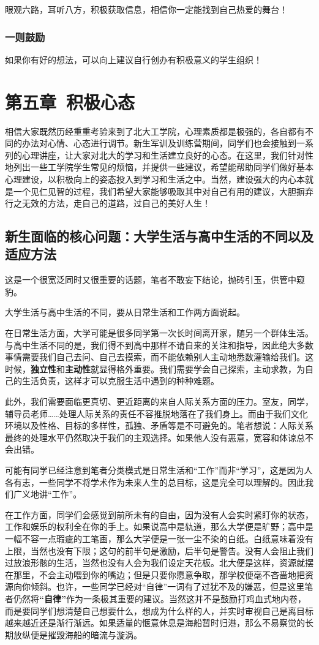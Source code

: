\documentclass[11pt,oneside]{book}
\begin{document}
眼观六路，耳听八方，积极获取信息，相信你一定能找到自己热爱的舞台！

\subsection{一则鼓励}
如果你有好的想法，可以向上建议自行创办有积极意义的学生组织！


\chapter{第五章\ 积极心态}
相信大家既然历经重重考验来到了北大工学院，心理素质都是极强的，各自都有不同的办法对心情、心态进行调节。新生军训及训练营期间，同学们也会接触到一系列的心理讲座，让大家对北大的学习和生活建立良好的心态。在这里，我们针对性地列出一些工学院学生常见的烦恼，并提供一些建议，希望能帮助同学们做好基本心理建设，以积极向上的姿态投入到学习和生活之中。当然，建设强大的内心本就是一个见仁见智的过程，我们希望大家能够吸取其中对自己有用的建议，大胆摒弃行之无效的方法，走自己的道路，过自己的美好人生！

\section{新生面临的核心问题：大学生活与高中生活的不同以及适应方法}
这是一个很宽泛同时又很重要的话题，笔者不敢妄下结论，抛砖引玉，供管中窥豹。

大学生活与高中生活的不同，要从日常生活和工作两方面说起。

在日常生活方面，大学可能是很多同学第一次长时间离开家，随另一个群体生活。与高中生活不同的是，我们得不到高中那样不请自来的关注和指导，因此绝大多数事情需要我们自己去问、自己去摸索，而不能依赖别人主动地悉数灌输给我们。这时候，\textbf{独立性}和\textbf{主动性}就显得格外重要。我们需要学会自己探索，主动求教，为自己的生活负责，这样才可以克服生活中遇到的种种难题。

此外，我们需要面临更真切、更近距离的来自人际关系方面的压力。室友，同学，辅导员老师……处理人际关系的责任不容推脱地落在了我们身上。而由于我们文化环境以及性格、目标的多样性，孤独、矛盾等是不可避免的。笔者想说：人际关系最终的处理水平仍然取决于我们的主观选择。如果他人没有恶意，宽容和体谅总不会出错。

可能有同学已经注意到笔者分类模式是日常生活和“工作”而非“学习”，这是因为人各有志，一些同学不将学术作为未来人生的总目标，这是完全可以理解的。因此我们广义地讲“工作”。

在工作方面，同学们会感觉到前所未有的自由，因为没有人会实时紧盯你的状态，工作和娱乐的权利全在你的手上。如果说高中是轨道，那么大学便是旷野；高中是一幅不容一点瑕疵的工笔画，那么大学便是一张一尘不染的白纸。白纸意味着没有上限，当然也没有下限；这句的前半句是激励，后半句是警告。没有人会阻止我们过放浪形骸的生活，当然也没有人会为我们设定天花板。北大便是这样，资源就摆在那里，不会主动喂到你的嘴边；但是只要你愿意争取，那学校便毫不吝啬地把资源向你倾斜。也许，一些同学已经对“自律”一词有了过犹不及的嫌恶，但是这里笔者仍然将\textbf{“自律”}作为一条极其重要的建议。当然这并不是鼓励打鸡血式地内卷，而是要同学们想清楚自己想要什么，想成为什么样的人，并实时审视自己是离目标越来越近还是渐行渐远。如果适量的惬意休息是海船暂时归港，那么不易察觉的长期放纵便是摧毁海船的暗流与漩涡。
\end{document}
